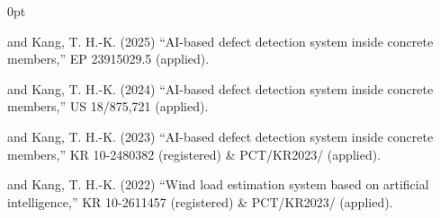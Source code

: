 

\vspace{\acvSectionContentTopSkip}\vspace{-3mm}
\begin{adjustwidth}{\cvindent}{0pt}
\begin{pubSubsectionNum}
    \item \me and Kang, T. H.-K. (2025) ``AI-based defect detection system inside concrete members,'' EP 23915029.5 (applied).
    \item \me and Kang, T. H.-K. (2024) ``AI-based defect detection system inside concrete members,'' US 18/875,721 (applied).
    \item \me and Kang, T. H.-K. (2023) ``AI-based defect detection system inside concrete members,'' KR 10-2480382 (registered) \& PCT/\allowbreak KR2023/ (applied).
    \item \me and Kang, T. H.-K. (2022) ``Wind load estimation system based on artificial intelligence,'' KR 10-2611457 (registered) \& PCT/\allowbreak KR2023/ (applied).
\end{pubSubsectionNum}
\end{adjustwidth}
